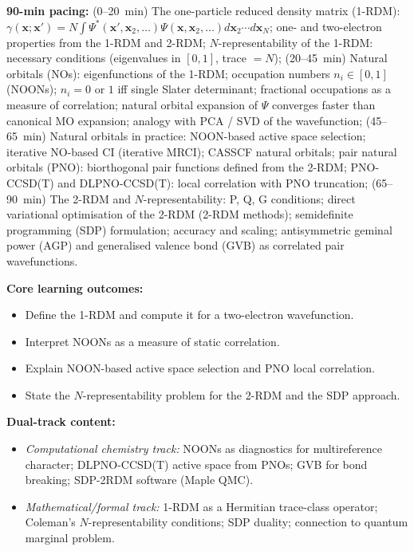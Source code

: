 \documentclass[11pt,a4paper]{article}
\begin{document}
\begin{tcolorbox}[modulebox, title={Module~II.1 --- Lecture L09: Natural Orbitals and the One-Particle Density Matrix}]
\textbf{90-min pacing:} (0--20~min) The one-particle reduced density matrix (1-RDM):
$\gamma(\mathbf{x};\mathbf{x}')=N\int\Psi^*(\mathbf{x}',\mathbf{x}_2,\ldots)\Psi(\mathbf{x},\mathbf{x}_2,\ldots)d\mathbf{x}_2\cdots d\mathbf{x}_N$;
one- and two-electron properties from the 1-RDM and 2-RDM;
$N$-representability of the 1-RDM: necessary conditions (eigenvalues in $[0,1]$, trace $=N$);
(20--45~min) Natural orbitals (NOs): eigenfunctions of the 1-RDM;
occupation numbers $n_i\in[0,1]$ (NOONs); $n_i=0$ or $1$ iff single Slater determinant;
fractional occupations as a measure of correlation; natural orbital expansion of $\Psi$
converges faster than canonical MO expansion; analogy with PCA / SVD of the wavefunction;
(45--65~min) Natural orbitals in practice: NOON-based active space selection;
iterative NO-based CI (iterative MRCI); CASSCF natural orbitals;
pair natural orbitals (PNO): biorthogonal pair functions defined from the 2-RDM;
PNO-CCSD(T) and DLPNO-CCSD(T): local correlation with PNO truncation;
(65--90~min) The 2-RDM and $N$-representability: P, Q, G conditions;
direct variational optimisation of the 2-RDM (2-RDM methods);
semidefinite programming (SDP) formulation; accuracy and scaling;
antisymmetric geminal power (AGP) and generalised valence bond (GVB) as
correlated pair wavefunctions.

\medskip\textbf{Core learning outcomes:}
\begin{itemize}[leftmargin=1.4em,topsep=2pt,itemsep=1pt]
  \item Define the 1-RDM and compute it for a two-electron wavefunction.
  \item Interpret NOONs as a measure of static correlation.
  \item Explain NOON-based active space selection and PNO local correlation.
  \item State the $N$-representability problem for the 2-RDM and the SDP approach.
\end{itemize}

\medskip\textbf{Dual-track content:}
\begin{itemize}[leftmargin=1.4em,topsep=2pt,itemsep=1pt]
  \item \textit{Computational chemistry track:} NOONs as diagnostics for multireference character;
    DLPNO-CCSD(T) active space from PNOs; GVB for bond breaking; SDP-2RDM software (Maple QMC).
  \item \textit{Mathematical/formal track:} 1-RDM as a Hermitian trace-class operator;
    Coleman's $N$-representability conditions; SDP duality; connection to quantum marginal problem.
\end{itemize}


\end{tcolorbox}
\end{document}

